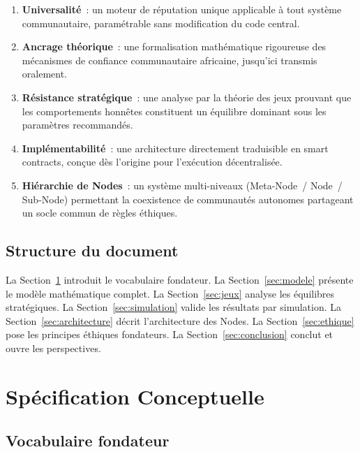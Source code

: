 \documentclass[12pt,a4paper]{article}
\theoremstyle{definition}
\theoremstyle{plain}
\theoremstyle{remark}
\newcommand{\1}{\mathbf{1}}
\begin{document}
\begin{enumerate}
  \item \textbf{Universalité}~: un moteur de réputation unique applicable à
    tout système communautaire, paramétrable sans modification du code central.

  \item \textbf{Ancrage théorique}~: une formalisation mathématique rigoureuse
    des mécanismes de confiance communautaire africaine, jusqu'ici transmis
    oralement.

  \item \textbf{Résistance stratégique}~: une analyse par la théorie des jeux
    prouvant que les comportements honnêtes constituent un équilibre dominant
    sous les paramètres recommandés.

  \item \textbf{Implémentabilité}~: une architecture directement traduisible
    en smart contracts, conçue dès l'origine pour l'exécution décentralisée.

  \item \textbf{Hiérarchie de Nodes}~: un système multi-niveaux
    (Meta-Node~/ Node~/ Sub-Node) permettant la coexistence de communautés
    autonomes partageant un socle commun de règles éthiques.
\end{enumerate}

\subsection{Structure du document}

La Section~\ref{sec:concepts} introduit le vocabulaire fondateur. La
Section~\ref{sec:modele} présente le modèle mathématique complet. La
Section~\ref{sec:jeux} analyse les équilibres stratégiques. La
Section~\ref{sec:simulation} valide les résultats par simulation. La
Section~\ref{sec:architecture} décrit l'architecture des Nodes. La
Section~\ref{sec:ethique} pose les principes éthiques fondateurs. La
Section~\ref{sec:conclusion} conclut et ouvre les perspectives.

\section{Spécification Conceptuelle}
\label{sec:concepts}

\subsection{Vocabulaire fondateur}
\end{document}
